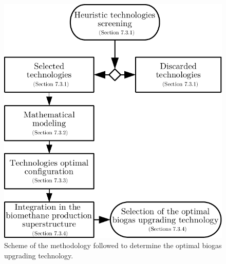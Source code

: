 \begin{refsection}[referencesCh7]
\begin{figure}[h]
	\centering
	\includegraphics[width=0.8\linewidth, trim={0cm 0cm 0cm 0cm},clip]{gfx/Chapter7/Figure1.pdf} 
	\caption{Scheme of the methodology followed to determine the optimal biogas	upgrading technology.}
	\label{fig:Fig1}
\end{figure}


\end{refsection}
